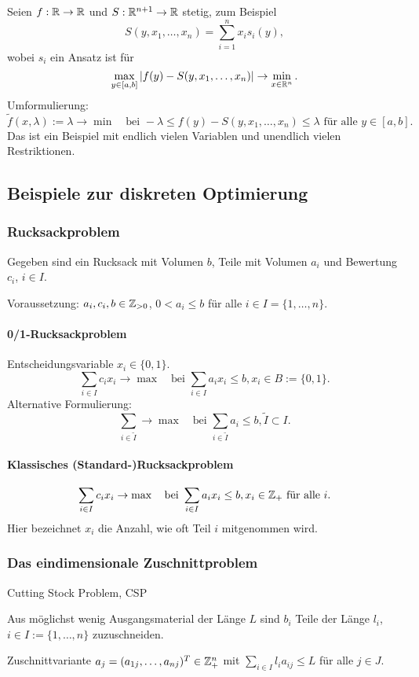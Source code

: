 \documentclass[
 a4paper,
 12pt,
 parskip=half
 ]{scrartcl}
\theoremstyle{plain}
\theoremstyle{definition}
\numberwithin{equation}{section}
\begin{document}
Seien $f: \mathbb{R} \to \mathbb{R}$ und $S: \mathbb{R}^{n+1} \to \mathbb{R}$ stetig, zum Beispiel
\[ S(y, x_1, \ldots, x_n) = \sum_{i=1}^n x_i s_i(y), \]
wobei $s_i$ ein Ansatz ist für
\[ \max_{y \in [a,b]} | f(y) - S(y, x_1, \ldots, x_n) | \to \min_{x \in
    \mathbb{R}^n}. \]
Umformulierung:
\[ \tilde{f}(x,\lambda) := \lambda \to \min \quad \text{bei } - \lambda \le
  f(y) - S(y, x_1, \ldots, x_n) \le \lambda \text{ für alle } y \in [a,b]. \]
Das ist ein Beispiel mit endlich vielen Variablen und unendlich vielen
Restriktionen.

\subsection{Beispiele zur diskreten Optimierung}
\subsubsection{Rucksackproblem}
Gegeben sind ein Rucksack mit Volumen $b$, Teile mit Volumen $a_i$ und Bewertung
$c_i$, $i \in I$.

Voraussetzung: $a_i, c_i, b \in \mathbb{Z}_{>0}$, $0 < a_i \le b$ für alle $i \in
I = \{1, \ldots, n\}$.

\paragraph{0/1-Rucksackproblem}
Entscheidungsvariable $x_i \in \{0,1\}$.
\[ \sum_{i \in I} c_i x_i \to \max \quad \text{bei } \sum_{i \in I} a_i x_i \le
  b, x_i \in B := \{0,1\}. \]
Alternative Formulierung:
\[ \sum_{i \in \tilde{I}} \to \max \quad \text{bei } \sum_{i \in \tilde{I}} a_i
  \le b, \tilde{I} \subset I. \]

\paragraph{Klassisches (Standard-)Rucksackproblem}
\[ \sum_{i \in I} c_i x_i \to \max \quad \text{bei } \sum_{i \in I} a_i x_i \le
  b, x_i \in \mathbb{Z}_+ \text{ für alle } i. \]
Hier bezeichnet $x_i$ die Anzahl, wie oft Teil $i$ mitgenommen wird.

\subsubsection{Das eindimensionale Zuschnittproblem}
Cutting Stock Problem, CSP

Aus möglichst wenig Ausgangsmaterial der Länge $L$ sind $b_i$ Teile der Länge
$l_i$, $i \in I := \{ 1, \ldots, n \}$ zuzuschneiden.

Zuschnittvariante $a_j = (a_{1j}, \ldots, a_{nj})^T \in \mathbb{Z}_+^n$ mit
$\sum_{i \in I} l_i a_{ij} \le L$ für alle $j \in J$.
\end{document}
